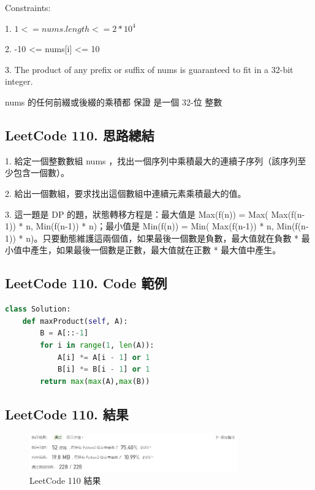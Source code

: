 \documentclass[10pt,UTF8]{ctexart}
\begin{document}
Constraints:

1. $1 <= nums.length <= 2 * 10^{4}$

2. -10 <= nums[i] <= 10

3. The product of any prefix or suffix of nums is guaranteed to fit in a 32-bit integer.

nums 的任何前綴或後綴的乘積都 保證 是一個 32-位 整數

\subsection{LeetCode 110. 思路總結}

1. 給定一個整數數組 nums ，找出一個序列中乘積最大的連續子序列（該序列至少包含一個數）。

2. 給出一個數組，要求找出這個數組中連續元素乘積最大的值。

3. 這一題是 DP 的題，狀態轉移方程是：最大值是 Max(f(n)) = Max( Max(f(n-1)) * n, Min(f(n-1)) * n)；最小值是 Min(f(n)) = Min( Max(f(n-1)) * n, Min(f(n-1)) * n)。只要動態維護這兩個值，如果最後一個數是負數，最大值就在負數 * 最小值中產生，如果最後一個數是正數，最大值就在正數 * 最大值中產生。

\subsection{LeetCode 110. Code 範例}

\begin{lstlisting}[language={python}]
class Solution:
    def maxProduct(self, A):
        B = A[::-1]
        for i in range(1, len(A)):
            A[i] *= A[i - 1] or 1
            B[i] *= B[i - 1] or 1
        return max(max(A),max(B)) 
\end{lstlisting}

\subsection{LeetCode 110. 結果}

\begin{figure}[H]
\centering 
\includegraphics[width=0.80\textwidth]{lc-110-o.png} 
\caption{LeetCode 110 結果}
\label{Test}
\end{figure}


\newpage
\end{document}
